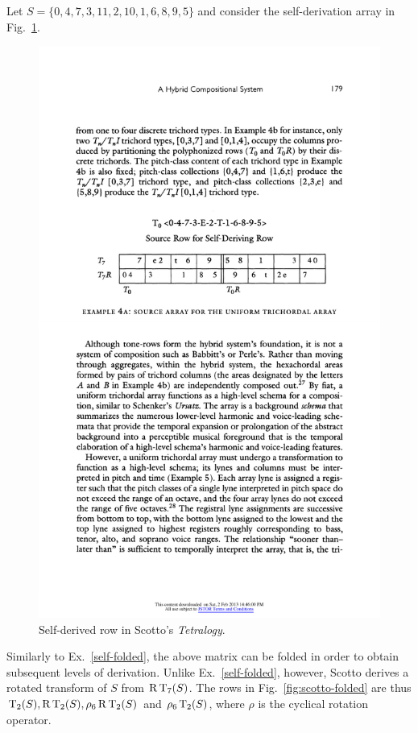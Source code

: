 \begin{example}
    \cite[180]{Scotto2000}
    \label{ex:scotto}
    Let $S = \{ 0, 4, 7, 3, 11, 2, 10, 1, 6, 8, 9, 5 \}$ and consider the self-derivation array in Fig.~\ref{fig:scotto-array}.
    \begin{figure}[H]
    	\centering
    	\includegraphics[width=5in]{figures/scotto-array.pdf}
		\caption[Self-derived row in Scotto's \emph{Tetralogy}]{Self-derived row in Scotto's \emph{Tetralogy}.}
    	\label{fig:scotto-array}
	\end{figure}
	\noindent Similarly to Ex.~\ref{self-folded}, the above matrix can be folded in order to obtain subsequent levels of derivation. Unlike Ex.~\ref{self-folded}, however, Scotto derives a rotated transform of $S$ from $\operatorname{R}\operatorname{T}_7(S)$. The rows in Fig.~\ref{fig:scotto-folded} are thus $\operatorname{T}_2(S), \operatorname{R}\operatorname{T}_2(S), \rho_6\operatorname{R}\operatorname{T}_2(S)$ and $\rho_6\operatorname{T}_2(S)$, where $\rho$ is the cyclical rotation operator.

\end{example}
